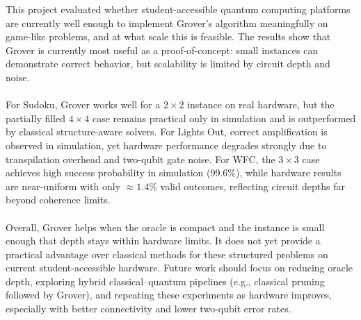 This project evaluated whether student-accessible quantum computing platforms are currently well enough to implement Grover’s algorithm meaningfully on game-like problems, and at what scale this is feasible. The results show that Grover is currently most useful as a proof-of-concept: small instances can demonstrate correct behavior, but scalability is limited by circuit depth and noise.
\\
\\
For Sudoku, Grover works well for a $2\times 2$ instance on real hardware, but the partially filled $4\times 4$ case remains practical only in simulation and is outperformed by classical structure-aware solvers. For Lights Out, correct amplification is observed in simulation, yet hardware performance degrades strongly due to transpilation overhead and two-qubit gate noise. For WFC, the $3\times 3$ case achieves high success probability in simulation (99.6\%), while hardware results are near-uniform with only $\approx 1.4\%$ valid outcomes, reflecting circuit depths far beyond coherence limits.
\\
\\
Overall, Grover helps when the oracle is compact and the instance is small enough that depth stays within hardware limits. It does not yet provide a practical advantage over classical methods for these structured problems on current student-accessible hardware. Future work should focus on reducing oracle depth, exploring hybrid classical--quantum pipelines (e.g., classical pruning followed by Grover), and repeating these experiments as hardware improves, especially with better connectivity and lower two-qubit error rates.